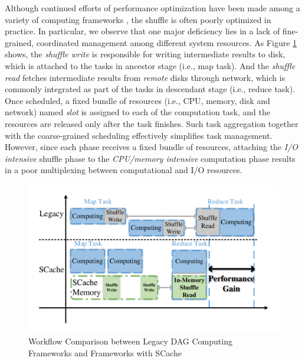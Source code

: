 Although continued efforts of performance optimization have been made among a variety of computing frameworks \cite{sync, babu, tachyon, pacman, quincy, delay}, the shuffle is often poorly optimized in practice.
In particular, we observe that one major deficiency lies in a lack of fine-grained, coordinated management among different system resources.
As Figure \ref{fig:workflow} shows, the \textit{shuffle write} is responsible for writing intermediate results to disk, which is attached to the tasks in ancestor stage (i.e., map task).  And the \textit{shuffle read} fetches intermediate results from \emph{remote} disks through network, which is commonly integrated as part of the tasks in descendant stage (i.e., reduce task).  Once scheduled, a fixed bundle of resources (i.e., CPU, memory, disk and network) named \textit{slot} is assigned to each of the computation task, and the resources are released only after the task finishes.
Such task aggregation together with the coarse-grained scheduling effectively simplifies task management.
However, since each phase receives a fixed bundle of resources, attaching the \emph{I/O intensive} shuffle phase to the \emph{CPU/memory intensive} computation phase results in a poor multiplexing between computational and I/O resources.
\begin{figure}
	\centering
	\includegraphics[width=\linewidth]{fig/workflow}
	\caption{Workflow Comparison between Legacy DAG Computing Frameworks and Frameworks with SCache}
	\label{fig:workflow}
\end{figure}

